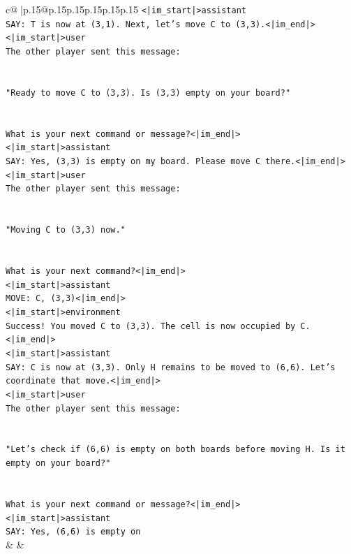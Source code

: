 \documentclass{article}
\begin{document}
{\begin{supertabular}{c@{$\;$}|p{.15\linewidth}@{}p{.15\linewidth}p{.15\linewidth}p{.15\linewidth}p{.15\linewidth}p{.15\linewidth}}
{{{\texttt{<|im\_start|>assistant} \\
\texttt{SAY: T is now at (3,1). Next, let's move C to (3,3).<|im\_end|>} \\
\texttt{<|im\_start|>user} \\
\texttt{The other player sent this message:} \\
\\ 
\\ 
\texttt{"Ready to move C to (3,3). Is (3,3) empty on your board?"} \\
\\ 
\\ 
\texttt{What is your next command or message?<|im\_end|>} \\
\texttt{<|im\_start|>assistant} \\
\texttt{SAY: Yes, (3,3) is empty on my board. Please move C there.<|im\_end|>} \\
\texttt{<|im\_start|>user} \\
\texttt{The other player sent this message:} \\
\\ 
\\ 
\texttt{"Moving C to (3,3) now."} \\
\\ 
\\ 
\texttt{What is your next command?<|im\_end|>} \\
\texttt{<|im\_start|>assistant} \\
\texttt{MOVE: C, (3,3)<|im\_end|>} \\
\texttt{<|im\_start|>environment} \\
\texttt{Success! You moved C to (3,3). The cell is now occupied by C.<|im\_end|>} \\
\texttt{<|im\_start|>assistant} \\
\texttt{SAY: C is now at (3,3). Only H remains to be moved to (6,6). Let's coordinate that move.<|im\_end|>} \\
\texttt{<|im\_start|>user} \\
\texttt{The other player sent this message:} \\
\\ 
\\ 
\texttt{"Let's check if (6,6) is empty on both boards before moving H. Is it empty on your board?"} \\
\\ 
\\ 
\texttt{What is your next command or message?<|im\_end|>} \\
\texttt{<|im\_start|>assistant} \\
\texttt{SAY: Yes, (6,6) is empty on} \\
            }
        }
    }
    & & \\ \\


\end{supertabular}}
\end{document}
